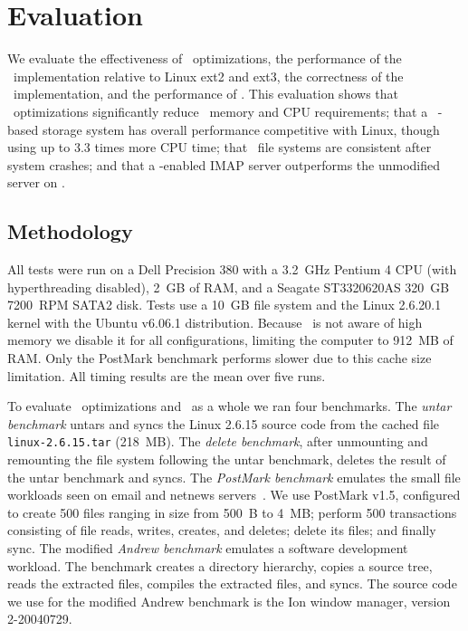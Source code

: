 
\section {Evaluation}
\label{sec:evaluation}
\label{eval}

We evaluate
%
the effectiveness of \patch\ optimizations,
%
the performance of the \Kudos\ implementation relative to Linux ext2
and ext3,
%
the correctness of the \Kudos\ implementation,
%
and the performance of \patchgroups.
%
This evaluation shows
%
that \patch\ optimizations significantly reduce \patch\ memory and CPU
requirements;
%
that a \Kudos\ \patch-based storage system has overall performance
competitive with Linux, though using up to 3.3 times more CPU time;
%
that \Kudos\ file systems are consistent after system crashes;
%
and that a \patchgroup-enabled IMAP server outperforms
the unmodified server on \Kudos.

\subsection{Methodology}

All tests were run on a Dell Precision 380 with a 3.2~GHz Pentium 4
CPU (with hyperthreading disabled), 2~GB of RAM, and a Seagate ST3320620AS 320~GB 7200~RPM SATA2 disk.
%
Tests use a 10~GB file system and the Linux 2.6.20.1 kernel
with the Ubuntu v6.06.1 distribution.
%
Because \Kudos\ is not aware of high memory we disable it for all
configurations, limiting the computer to 912~MB of RAM.
%
Only the PostMark benchmark performs slower due to this cache size limitation.
%
All timing results are the mean over five runs.

To evaluate \patch\ optimizations and \Kudos\ as a whole we ran four
benchmarks.
%
The \emph{untar benchmark} untars and syncs the Linux 2.6.15 source code
from the cached file \texttt{linux-2.6.15.tar} (218~MB).
%
The \emph{delete benchmark}, after unmounting and remounting the file
system following the untar benchmark, deletes the result of the untar
benchmark and syncs.
%
The \emph{PostMark benchmark} emulates the small file workloads seen
on email and netnews servers~\cite{postmark}. We use PostMark v1.5,
configured to create 500 files ranging in size from 500~B to 4~MB;
perform 500 transactions consisting of file reads, writes, creates,
and deletes; delete its files; and finally sync.
%
The modified \emph{Andrew benchmark} emulates a software development
workload.  The benchmark creates a directory hierarchy, copies a
source tree, reads the extracted files, compiles the extracted files,
and syncs. The source code we use for the modified Andrew benchmark is
the Ion window manager, version 2-20040729.

